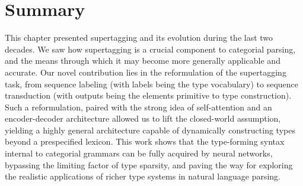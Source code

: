 \section{Summary} 
This chapter presented supertagging and its evolution during the last two decades.
We saw how supertagging is a crucial component to categorial parsing, and the means through which it may become more generally applicable and accurate.
Our novel contribution lies in the reformulation of the supertagging task, from sequence labeling (with labels being the type vocabulary) to sequence transduction (with outputs being the elements primitive to type construction).
Such a reformulation, paired with the strong idea of self-attention and an encoder-decoder architecture allowed us to lift the closed-world assumption, yielding a highly general architecture capable of dynamically constructing types beyond a prespecified lexicon.
This work shows that the type-forming syntax internal to categorial grammars can be fully acquired by neural networks, bypassing the limiting factor of type sparsity, and paving the way for exploring the realistic applications of richer type systems in natural language parsing.
